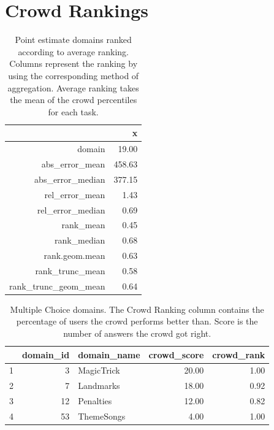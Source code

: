 \documentclass[12pt]{article}
\begin{document}
\clearpage

\section{Crowd Rankings}



\begin{table}[ht]
\centering
\begin{tabular}{rr}
  \hline
 & x \\ 
  \hline
domain & 19.00 \\ 
  abs\_error\_mean & 458.63 \\ 
  abs\_error\_median & 377.15 \\ 
  rel\_error\_mean & 1.43 \\ 
  rel\_error\_median & 0.69 \\ 
  rank\_mean & 0.45 \\ 
  rank\_median & 0.68 \\ 
  rank.geom.mean & 0.63 \\ 
  rank\_trunc\_mean & 0.58 \\ 
  rank\_trunc\_geom\_mean & 0.64 \\ 
   \hline
\end{tabular}
\caption{Point estimate domains ranked according to average ranking. Columns represent 
       the ranking by using the corresponding method of aggregation. Average ranking takes the 
       mean of the crowd percentiles for each task.} 
\end{table}



\begin{table}[ht]
\centering
\begin{tabular}{rrlrr}
  \hline
 & domain\_id & domain\_name & crowd\_score & crowd\_rank \\ 
  \hline
1 &   3 & MagicTrick & 20.00 & 1.00 \\ 
  2 &   7 & Landmarks & 18.00 & 0.92 \\ 
  3 &  12 & Penalties & 12.00 & 0.82 \\ 
  4 &  53 & ThemeSongs & 4.00 & 1.00 \\ 
   \hline
\end{tabular}
\caption{Multiple Choice domains. The Crowd Ranking column contains
       the percentage of users the crowd performs better than. 
       Score is the number of answers the crowd got right.} 
\end{table}
\end{document}
